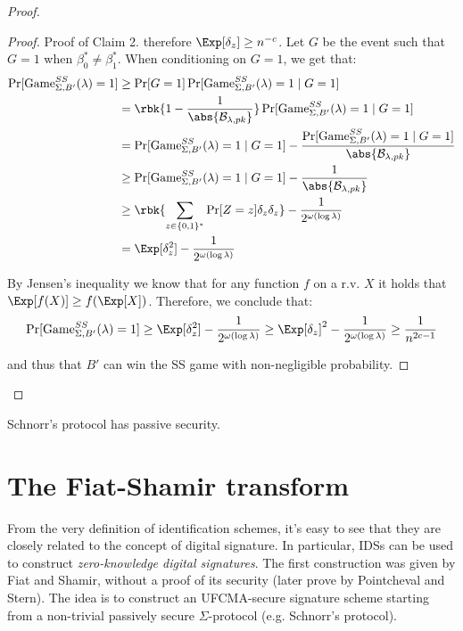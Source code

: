 \documentclass[a4paper, 12pt]{report}
\begin{document}
\begin{proof}
\begin{proof}{Proof of Claim 2.}
            therefore $\Exp[\delta_z] \geq n^{-c}$. Let $G$ be the event such that $G = 1$ when $\beta_0^* \neq \beta_1^*$. When conditioning on $G = 1$, we get that:
            \[\begin{split}
                \Pr[\mathrm{Game}_{\Sigma, B'}^{SS}(\lambda) = 1] &\geq \Pr[G = 1] \Pr[\mathrm{Game}_{\Sigma, B'}^{SS}(\lambda) = 1 \mid G = 1] \\
                &= \rbk{1- \frac{1}{\abs{\mathcal{B}_{\lambda, pk}}}} \Pr[\mathrm{Game}_{\Sigma, B'}^{SS}(\lambda) = 1 \mid G = 1] \\
                &= \Pr[\mathrm{Game}_{\Sigma, B'}^{SS}(\lambda) = 1 \mid G = 1] - \frac{\Pr[\mathrm{Game}_{\Sigma, B'}^{SS}(\lambda) = 1 \mid G = 1]}{\abs{\mathcal{B}_{\lambda, pk}}} \\
                &\geq \Pr[\mathrm{Game}_{\Sigma, B'}^{SS}(\lambda) = 1 \mid G = 1] - \frac{1}{\abs{\mathcal{B}_{\lambda, pk}}} \\
                &\geq \rbk{\sum_{z \in \{0,1\}^*} \Pr[Z = z] \delta_z \delta_z} - \frac{1}{2^{\omega(\log \lambda)}} \\
                &= \Exp[\delta_z^2] - \frac{1}{2^{\omega(\log \lambda)}} \\
            \end{split}\]

            By Jensen's inequality we know that for any function $f$ on a r.v. $X$ it holds that $\Exp[f(X)] \geq f(\Exp[X])$. Therefore, we conclude that:
            \[\Pr[\mathrm{Game}_{\Sigma, B'}^{SS}(\lambda) = 1] \geq \Exp[\delta_z^2] - \frac{1}{2^{\omega(\log \lambda)}} \geq \Exp[\delta_z]^2 - \frac{1}{2^{\omega(\log \lambda)}} \geq \frac{1}{n^{2c-1}}\]
            
            and thus that $B'$ can win the SS game with non-negligible probability.
        \end{proof}
    \end{proof}

    \begin{framedcor}{}
        Schnorr's protocol has passive security.
    \end{framedcor}

    \section{The Fiat-Shamir transform}

    From the very definition of identification schemes, it's easy to see that they are closely related to the concept of digital signature. In particular, IDSs can be used to construct \textit{zero-knowledge digital signatures}. The first construction was given by Fiat and Shamir, without a proof of its security (later prove by Pointcheval and Stern). The idea is to construct an UFCMA-secure signature scheme starting from a non-trivial passively secure $\Sigma$-protocol (e.g. Schnorr's protocol).
\end{document}
